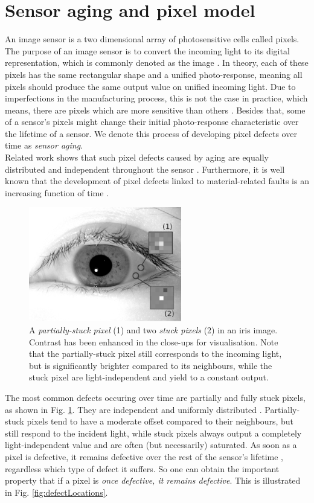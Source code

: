\documentclass[10pt,twocolumn,letterpaper]{article}
\begin{document}
\section{Sensor aging and pixel model}
An image sensor is a two dimensional array of photosensitive cells called pixels. The purpose of an image sensor is to convert the incoming light to its digital representation, which is commonly denoted as the image \cite{imageSensors}. In theory, each of these pixels has the same rectangular shape and a unified photo-response, meaning all pixels should produce the same output value on unified incoming light. Due to imperfections in the manufacturing process, this is not the case in practice, which means, there are pixels which are more sensitive than others \cite{camAndDisplays}. Besides that, some of a sensor's pixels might change their initial photo-response characteristic over the lifetime of a sensor. We denote this process of developing pixel defects over time as \emph{sensor aging}.   \\
Related work shows that such pixel defects caused by aging are equally distributed and independent throughout the sensor \cite{datingImages, inFieldDefects, defectDetection}. Furthermore, it is well known that the development of pixel defects linked to material-related faults is an increasing function of time \cite{failureSemi}. \\

\begin{figure}
\centering
\includegraphics[height=5cm]{img/defects.png}
\caption{A \emph{partially-stuck pixel} (1) and two \emph{stuck pixels} (2) in an iris image. Contrast has been enhanced in the close-ups for visualisation. Note that the partially-stuck pixel still corresponds to the incoming light, but is significantly brighter compared to its neighbours, while the stuck pixel are light-independent and yield to a constant output.  }
\label{fig:hotStuck}
\end{figure}

The most common defects occuring over time are partially and fully stuck pixels, as shown in Fig. \ref{fig:hotStuck}. They are independent and uniformly distributed \cite{failureSemi, defectIdentification, fridrich}. Partially-stuck pixels tend to have a moderate offset compared to their neighbours, but still respond to the incident light, while stuck pixels always output a completely light-independent value and are often (but necessarily) saturated. As soon as a pixel is defective, it remains defective over the rest of the sensor's lifetime \cite{failureSemi}, regardless which type of defect it suffers. So one can obtain the important property that if a pixel is \emph{once defective, it remains defective}. This is illustrated in Fig. \ref{fig:defectLocations}.
\end{document}
